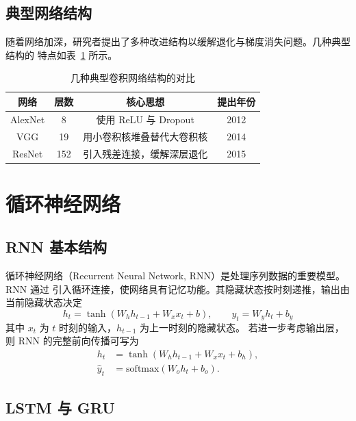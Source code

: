 \subsection{典型网络结构}

随着网络加深，研究者提出了多种改进结构以缓解退化与梯度消失问题。几种典型结构的
特点如表~\ref{tab:cnn} 所示。

\begin{table}[htbp]
  \centering
  \caption{几种典型卷积网络结构的对比}
  \label{tab:cnn}
  \begin{tabular}{cccc}
    \toprule
    网络    & 层数 & 核心思想                        & 提出年份 \\
    \midrule
    AlexNet & 8    & 使用 ReLU 与 Dropout            & 2012     \\
    VGG     & 19   & 用小卷积核堆叠替代大卷积核        & 2014     \\
    ResNet  & 152  & 引入残差连接，缓解深层退化        & 2015     \\
    \bottomrule
  \end{tabular}
\end{table}

\section{循环神经网络}

\subsection{RNN 基本结构}

循环神经网络（Recurrent Neural Network, RNN）是处理序列数据的重要模型。RNN 通过
引入循环连接，使网络具有记忆功能。其隐藏状态按时刻递推，输出由当前隐藏状态决定
\begin{equation}
  h_t = \tanh\left( W_h h_{t-1} + W_x x_t + b \right), \qquad y_t = W_y h_t + b_y
  \label{eq:rnn}
\end{equation}
其中 $x_t$ 为 $t$ 时刻的输入，$h_{t-1}$ 为上一时刻的隐藏状态。
若进一步考虑输出层，则 RNN 的完整前向传播可写为
\begin{equation}
  \begin{aligned}
    h_t &= \tanh(W_h h_{t-1} + W_x x_t + b_h), \\
    \hat{y}_t &= \mathrm{softmax}(W_o h_t + b_o).
  \end{aligned}
\end{equation}

\subsection{LSTM 与 GRU}

